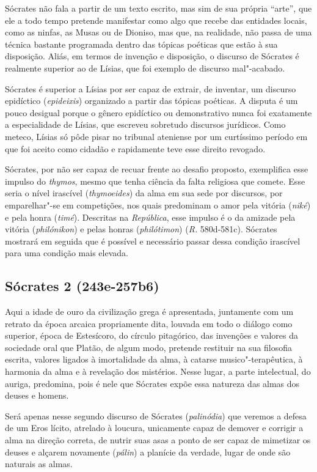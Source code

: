 Sócrates não fala a partir de um texto escrito, mas sim de sua própria
``arte'', que ele a todo tempo pretende manifestar como algo que recebe
das entidades locais, como as ninfas, as Musas ou de Dioniso, mas que,
na realidade, não passa de uma técnica bastante programada dentro das
tópicas poéticas que estão à sua disposição. Aliás, em termos de
invenção e disposição, o discurso de Sócrates é realmente superior ao de
Lísias, que foi exemplo de discurso mal"-acabado.

Sócrates é superior a Lísias por ser capaz de extrair, de inventar, um
discurso epidíctico (\emph{epideixis}) organizado a partir das tópicas
poéticas. A disputa é um pouco desigual porque o gênero epidíctico ou
demonstrativo nunca foi exatamente a especialidade de Lísias, que
escreveu sobretudo discursos jurídicos. Como meteco, Lísias só pôde
pisar no tribunal ateniense por um curtíssimo período em que foi aceito
como cidadão e rapidamente teve esse direito revogado.

Sócrates, por não ser capaz de recuar frente ao desafio proposto,
exemplifica esse impulso do \emph{thymos}, mesmo que tenha ciência da
falta religiosa que comete. Esse seria o nível irascível
(\emph{thymoeides}) da alma em sua sede por discursos, por emparelhar"-se
em competições, nos quais predominam o amor pela vitória (\emph{niké}) e
pela honra (\emph{timé}). Descritas na \emph{República}, esse impulso é
o da amizade pela vitória (\emph{philónikon}) e pelas honras
(\emph{philótimon}) (\emph{R.} 580d-581c). Sócrates mostrará em seguida
que é possível e necessário passar dessa condição irascível para uma
condição mais elevada.

\subsection{Sócrates 2 (243e-257b6)}

Aqui a idade de ouro da civilização
grega é apresentada, juntamente com um retrato da época arcaica
propriamente dita, louvada em todo o diálogo como superior, época de
Estesícoro, do círculo pitagórico, das invenções e valores da sociedade
oral que Platão, de algum modo, pretende restituir na sua filosofia
escrita, valores ligados à imortalidade da alma, à catarse
musico"-terapêutica, à harmonia da alma e à revelação dos mistérios.
Nesse lugar, a parte intelectual, do auriga, predomina, pois é nele que
Sócrates expõe essa natureza das almas dos deuses e homens.

Será apenas nesse segundo discurso de Sócrates (\emph{palinódia}) que
veremos a defesa de um Eros lícito, atrelado à loucura, unicamente capaz
de demover e corrigir a alma na direção correta, de nutrir suas asas a
ponto de ser capaz de mimetizar os deuses e alçarem novamente
(\emph{pálin}) a planície da verdade, lugar de onde são naturais as
almas.

